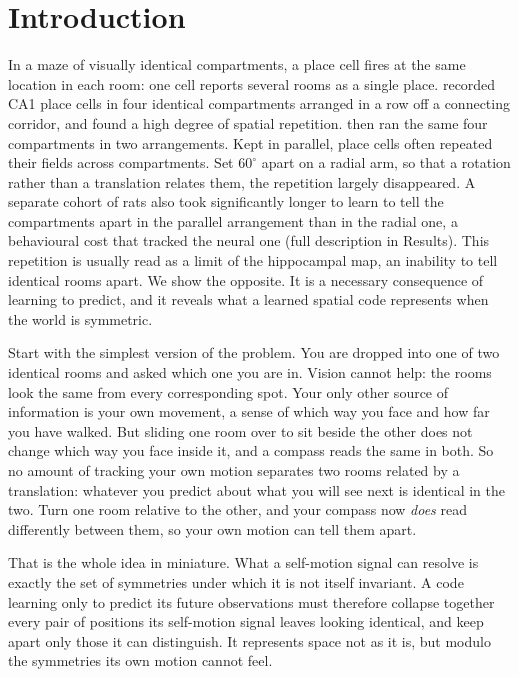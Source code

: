 \documentclass[9pt,lineno]{elife}
\begin{document}
\section{Introduction}

In a maze of visually identical compartments, a place cell fires at the same location in each room:
one cell reports several rooms as a single place. \citet{spiers2015} recorded CA1 place cells in
four identical compartments arranged in a row off a connecting corridor, and found a high degree of
spatial repetition. \citet{grieves2016} then ran the same four compartments in two arrangements.
Kept in parallel, place cells often repeated their fields across compartments. Set $60^\circ$ apart
on a radial arm, so that a rotation rather than a translation relates them, the repetition largely
disappeared. A separate cohort of rats also took significantly longer to learn to tell the
compartments apart in the parallel arrangement than in the radial one, a behavioural cost that tracked
the neural one (full description in Results). This repetition is usually read as a limit of the
hippocampal map, an inability to tell identical rooms apart. We show the opposite. It is a necessary
consequence of learning to predict, and it reveals what a learned spatial code represents when the
world is symmetric.

Start with the simplest version of the problem. You are dropped into one of two identical rooms and
asked which one you are in. Vision cannot help: the rooms look the same from every corresponding spot.
Your only other source of information is your own movement, a sense of which way you face and how far
you have walked. But sliding one room over to sit beside the other does not change which way you face
inside it, and a compass reads the same in both. So no amount of tracking your own motion separates
two rooms related by a translation: whatever you predict about what you will see next is identical in
the two. Turn one room relative to the other, and your compass now \emph{does} read differently
between them, so your own motion can tell them apart.

That is the whole idea in miniature. What a self-motion signal can resolve is exactly the set of
symmetries under which it is not itself invariant. A code learning only to predict its future
observations must therefore collapse together every pair of positions its self-motion signal leaves
looking identical, and keep apart only those it can distinguish. It represents space not as it is, but
modulo the symmetries its own motion cannot feel.
\end{document}
